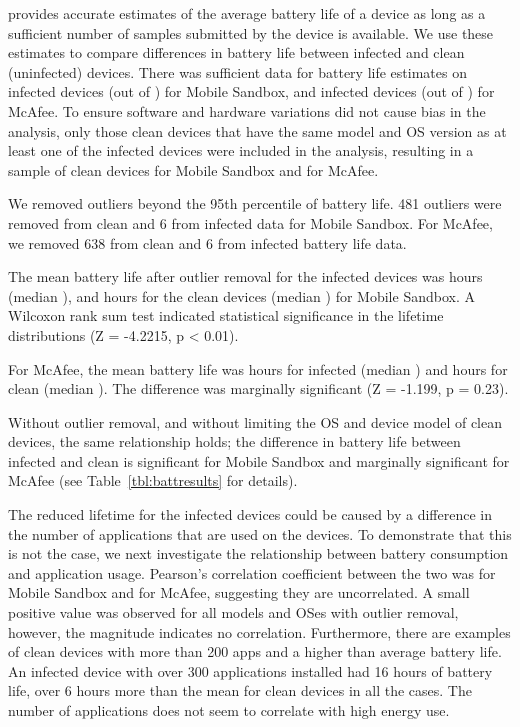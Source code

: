 \caratapp{} provides accurate estimates of the average battery life of
a device as long as a sufficient number of samples submitted
by the device is available. We use these estimates to compare
differences in battery life between infected and clean (uninfected)
devices. There was sufficient data for \caratapp{} battery life estimates on  infected devices (out of )
for Mobile Sandbox, and  infected devices (out of ) for McAfee. To ensure
software and hardware variations did not cause bias in the analysis,
only those clean devices that have the same model and OS version as at
least one of the infected devices were included in the analysis,
resulting in a sample of  clean devices for Mobile Sandbox and 
for McAfee.

We removed outliers beyond the 95th percentile of battery life.
481 outliers were removed from 
clean and 6 from infected data for Mobile Sandbox. For McAfee,
we removed 638 from clean and 6 from infected battery life data.


The mean battery life after outlier removal for the infected devices
was  hours (median ), and  hours for the clean devices
(median ) for Mobile Sandbox. A Wilcoxon rank sum test indicated
statistical significance in the lifetime distributions (Z = -4.2215, p
< 0.01).

For McAfee, the mean battery life was  hours for infected (median
) and  hours for clean (median ). The difference was
marginally significant (Z = -1.199, p = 0.23).

Without outlier removal, and without limiting the OS and device model
of clean devices, the same relationship holds; the difference in battery
life between infected and clean is significant for Mobile Sandbox and
marginally significant for McAfee (see Table~\ref{tbl:battresults} for
details).









The reduced lifetime for the infected devices could be caused by a
difference in the number of applications that are used on the
devices. To demonstrate that this is not the case, we next investigate
the relationship between battery consumption and application
usage. Pearson's correlation coefficient between the two was 
for Mobile Sandbox and  for McAfee, suggesting they are
uncorrelated. A small positive value was observed for all models and
OSes with outlier removal, however, the magnitude indicates no
correlation.  Furthermore, there are examples of clean devices with
more than 200 apps and a higher than average battery life.  An
infected device with over 300 applications installed had 16 hours of
battery life, over 6 hours more than the mean for clean devices 
in all the cases. The number of applications does not
seem to correlate with high energy use.


